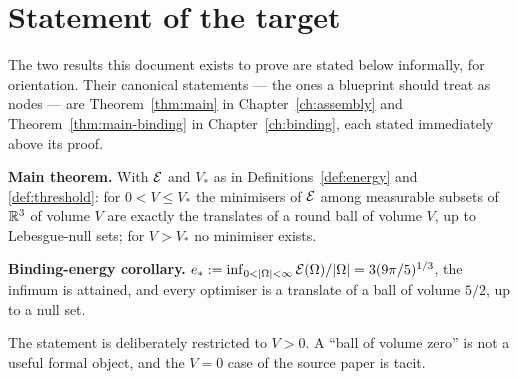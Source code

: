 \section*{Statement of the target}

The two results this document exists to prove are stated below informally,
for orientation.  Their canonical statements --- the ones a blueprint should
treat as nodes --- are Theorem~\ref{thm:main} in Chapter~\ref{ch:assembly} and
Theorem~\ref{thm:main-binding} in Chapter~\ref{ch:binding}, each stated
immediately above its proof.

\medskip\noindent
\textbf{Main theorem.}  With $\mathcal E$ and $V_*$ as in
Definitions~\ref{def:energy} and \ref{def:threshold}: for $0<V\le V_*$ the
minimisers of $\mathcal E$ among measurable subsets of $\mathbb R^3$ of volume $V$ are
exactly the translates of a round ball of volume $V$, up to Lebesgue-null
sets; for $V>V_*$ no minimiser exists.

\medskip\noindent
\textbf{Binding-energy corollary.}
$e_*:=\inf_{0<|\Omega|<\infty}\Ec(\Omega)/|\Omega|=3(9\pi/5)^{1/3}$, the
infimum is attained, and every optimiser is a translate of a ball of volume
$5/2$, up to a null set.

\medskip

\begin{remark}\label{rem:volume-zero}
The statement is deliberately restricted to $V>0$.  A ``ball of volume zero''
is not a useful formal object, and the $V=0$ case of the source paper is
tacit.
\end{remark}
